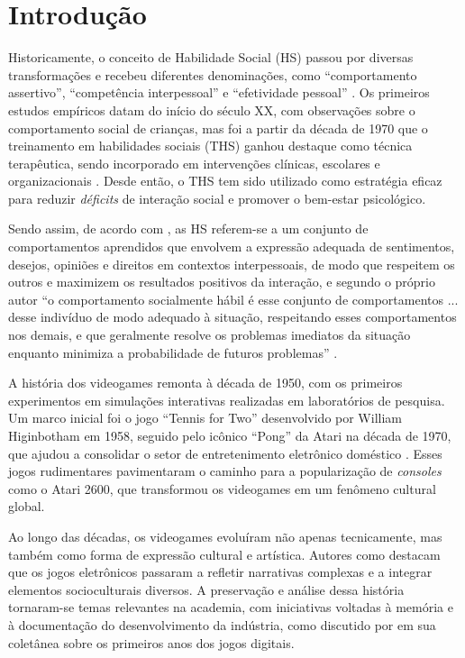 \chapter{Introdução}


Historicamente, o conceito de Habilidade Social (HS) passou por diversas transformações e recebeu diferentes denominações, como ``comportamento assertivo'', ``competência interpessoal'' e ``efetividade pessoal'' \cite{Wolpe1968} \cite{Lazarus1971}. Os primeiros estudos empíricos datam do início do século XX, com observações sobre o comportamento social de crianças, mas foi a partir da década de 1970 que o treinamento em habilidades sociais (THS) ganhou destaque como técnica terapêutica, sendo incorporado em intervenções clínicas, escolares e organizacionais \cite{caballo2003manual}. Desde então, o THS tem sido utilizado como estratégia eficaz para reduzir \textit{déficits} de interação social e promover o bem-estar psicológico.

Sendo assim, de acordo com , as HS referem-se a um conjunto de comportamentos aprendidos que envolvem a expressão adequada de sentimentos, desejos, opiniões e direitos em contextos interpessoais, de modo que respeitem os outros e maximizem os resultados positivos da interação, e segundo o próprio autor ``o comportamento socialmente hábil é esse conjunto de comportamentos ... desse indivíduo de modo adequado à situação, respeitando esses comportamentos nos demais, e que geralmente resolve os problemas imediatos da situação enquanto minimiza a probabilidade de futuros problemas'' .

A história dos videogames remonta à década de 1950, com os primeiros experimentos em simulações interativas realizadas em laboratórios de pesquisa. Um marco inicial foi o jogo ``Tennis for Two'' desenvolvido por William Higinbotham em 1958, seguido pelo icônico ``Pong'' da Atari na década de 1970, que ajudou a consolidar o setor de entretenimento eletrônico doméstico \cite{kent2001}. Esses jogos rudimentares pavimentaram o caminho para a popularização de \textit{consoles} como o Atari 2600, que transformou os videogames em um fenômeno cultural global.

Ao longo das décadas, os videogames evoluíram não apenas tecnicamente, mas também como forma de expressão cultural e artística. Autores como  destacam que os jogos eletrônicos passaram a refletir narrativas complexas e a integrar elementos socioculturais diversos. A preservação e análise dessa história tornaram-se temas relevantes na academia, com iniciativas voltadas à memória e à documentação do desenvolvimento da indústria, como discutido por  em sua coletânea sobre os primeiros anos dos jogos digitais.

